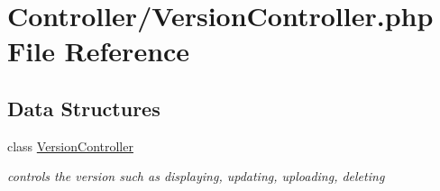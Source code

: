 \hypertarget{_version_controller_8php}{}\section{Controller/\+Version\+Controller.php File Reference}
\label{_version_controller_8php}
\subsection*{Data Structures}
\begin{DoxyCompactItemize}
\item 
class \hyperlink{class_version_controller}{Version\+Controller}
\begin{DoxyCompactList}\small\item\em controls the version such as displaying, updating, uploading, deleting \end{DoxyCompactList}\end{DoxyCompactItemize}
